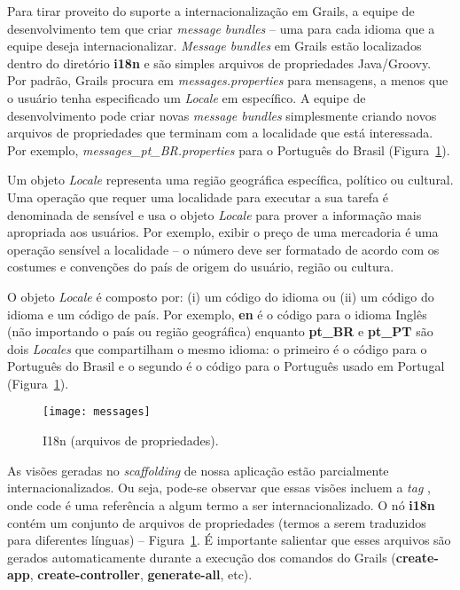 Para  tirar proveito do  suporte a  internacionalização em  Grails, a  equipe de
desenvolvimento tem que criar {\it message  bundles} -- uma para cada idioma que
a  equipe  deseja  internacionalizar.  {\it  Message bundles}  em  Grails  estão
localizados  dentro  do   diretório  {\bf  i18n}  e  são   simples  arquivos  de
propriedades    Java/Groovy.     Por   padrão,    Grails    procura   em    {\it
  messages.properties} para mensagens, a menos que o usuário tenha especificado 
um {\it Locale} em específico. A equipe de desenvolvimento pode criar novas {\it
  message  bundles}  simplesmente criando  novos  arquivos  de propriedades  que
terminam   com  a   localidade   que  está   interessada.   Por  exemplo,   {\it
  messages\_pt\_BR.properties}      para     o      Português      do     Brasil
(Figura~\ref{I18nFig}).

\begin{small}
\begin{cBox}
Um objeto {\it Locale} representa  uma região geográfica específica, político ou
cultural. Uma  operação que requer uma  localidade para executar a  sua tarefa é
denominada de sensível e usa o objeto {\it Locale} para prover a informação mais
apropriada aos  usuários. Por exemplo,  exibir o preço  de uma mercadoria  é uma
operação sensível a  localidade -- o número deve ser formatado  de acordo com os
costumes e convenções do país de origem do usuário, região ou cultura.

O objeto {\it Locale} é composto por:  (i) um código do idioma ou (ii) um código
do idioma e  um código de país. Por  exemplo, {\bf en} é o código  para o idioma
Inglês (não importando o país ou região geográfica) enquanto {\bf pt\_BR} e {\bf
  pt\_PT} são dois {\it Locales} que compartilham o mesmo idioma: o primeiro é o
código para o Português do Brasil e  o segundo é o código para o Português usado
em Portugal (Figura~\ref{I18nFig}).
\end{cBox}
\end{small}

\begin{figure}[\textit{}htb]
\centering\texttt{[image: messages]}
\caption{I18n (arquivos de propriedades).}
\label{I18nFig}
\end{figure}

As visões  geradas no  {\it scaffolding} de  nossa aplicação  estão parcialmente
internacionalizados. Ou seja,  pode-se observar que essas visões  incluem a {\it
  tag} {\bf  <g:message code>}, onde code é  uma referência a algum  termo a ser
internacionalizado.   O  nó  {\bf  i18n}  contém  um  conjunto  de  arquivos  de
propriedades   (termos   a  serem   traduzidos   para   diferentes  línguas)   –
Figura~\ref{I18nFig}.   É importante  salientar que  esses arquivos  são gerados
automaticamente  durante a execução  dos comandos  do Grails  ({\bf create-app},
{\bf create-controller}, {\bf generate-all}, etc).  

